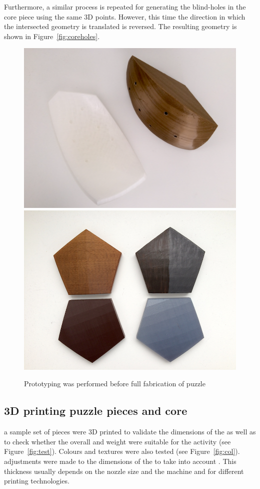 \documentclass[acmlarge,screen,dvipsnames]{acmart}
\begin{document}
Furthermore, a similar process is repeated for generating the
blind-holes in the  core piece using the same 3D points. However, this
time the direction in which the intersected geometry is translated is
reversed. The resulting geometry is shown in
Figure~\ref{fig:coreholes}. %

\begin{figure}[H]
  \centering
  {\includegraphics[width=0.445\linewidth]{images/coreANDpiece}}
   {\includegraphics[width=0.446\linewidth]{images/colour}}

  \caption{
    Prototyping was performed before full fabrication of puzzle}
\end{figure}


\subsection{3D printing puzzle pieces and core}
 a sample set of pieces were 3D
printed to validate the dimensions of the  as well as to check
whether the overall  and weight were suitable for the
 activity (see Figure~\ref{fig:test}). Colours and textures were also tested (see Figure~\ref{fig:col}). 
adjustments were made to the dimensions of the  to take into
account . This
thickness usually depends on the nozzle size and the machine and  for different printing technologies.
%
\end{document}

